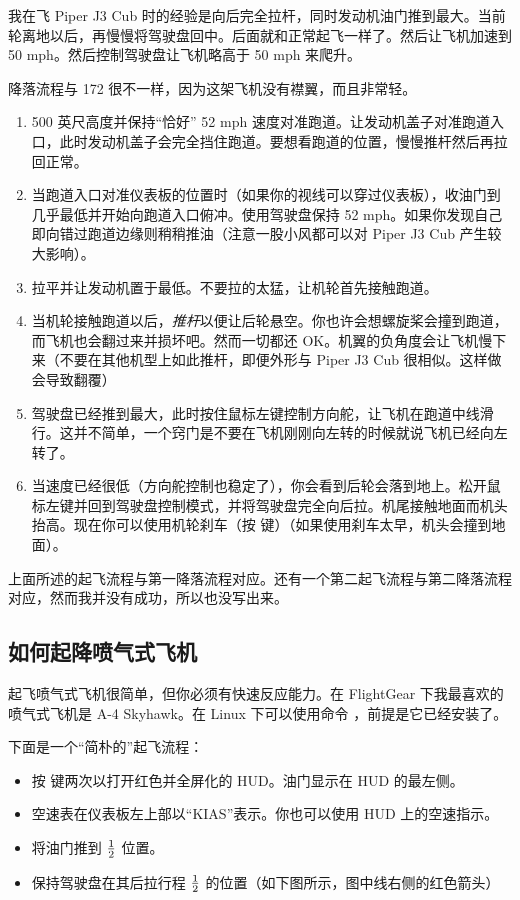 \begin{itemize}
我在飞 Piper J3 Cub 时的经验是向后完全拉杆，同时发动机油门推到最大。当前轮离地以后，再慢慢将驾驶盘回中。后面就和正常起飞一样了。然后让飞机加速到 50 mph。然后控制驾驶盘让飞机略高于 50 mph 来爬升。

降落流程与 172 很不一样，因为这架飞机没有襟翼，而且非常轻。

\begin{enumerate}
    \item 500 英尺高度并保持“恰好” 52 mph 速度对准跑道。让发动机盖子对准跑道入口，此时发动机盖子会完全挡住跑道。要想看跑道的位置，慢慢推杆然后再拉回正常。
    \item 当跑道入口对准仪表板的位置时（如果你的视线可以穿过仪表板），收油门到几乎最低并开始向跑道入口俯冲。使用驾驶盘保持 52 mph。如果你发现自己即向错过跑道边缘则稍稍推油（注意一股小风都可以对 Piper J3 Cub 产生较大影响）。
    \item 拉平并让发动机置于最低。不要拉的太猛，让机轮首先接触跑道。
    \item 当机轮接触跑道以后，\emph{推杆}以便让后轮悬空。你也许会想螺旋桨会撞到跑道，而飞机也会翻过来并损坏吧。然而一切都还 OK。机翼的负角度会让飞机慢下来（不要在其他机型上如此推杆，即便外形与 Piper J3 Cub 很相似。这样做会导致翻覆）
    \item 驾驶盘已经推到最大，此时按住鼠标左键控制方向舵，让飞机在跑道中线滑行。这并不简单，一个窍门是不要在飞机刚刚向左转的时候就说飞机已经向左转了。
    \item 当速度已经很低（方向舵控制也稳定了），你会看到后轮会落到地上。松开鼠标左键并回到驾驶盘控制模式，并将驾驶盘完全向后拉。机尾接触地面而机头抬高。现在你可以使用机轮刹车（按  键）（如果使用刹车太早，机头会撞到地面）。
\end{enumerate}

上面所述的起飞流程与第一降落流程对应。还有一个第二起飞流程与第二降落流程对应，然而我并没有成功，所以也没写出来。

 \subsection{如何起降喷气式飞机}
    \label{sec:Jet}

起飞喷气式飞机很简单，但你必须有快速反应能力。在 FlightGear 下我最喜欢的喷气式飞机是 A-4 Skyhawk。在 Linux 下可以使用命令 ，前提是它已经安装了。

下面是一个“简朴的”起飞流程：
\begin{itemize}
    \item 按  键两次以打开红色并全屏化的 HUD。油门显示在 HUD 的最左侧。
    \item 空速表在仪表板左上部以“KIAS”表示。你也可以使用 HUD 上的空速指示。
    \item 将油门推到 $1\over2$ 位置。
    \item 保持驾驶盘在其后拉行程 $1\over2$ 的位置（如下图所示，图中线右侧的红色箭头）


\end{itemize}
\end{itemize}
